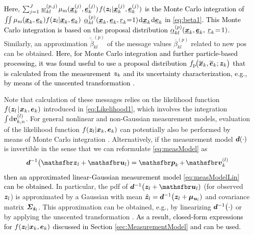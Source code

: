\documentclass[10pt, twoside, romanappendices]{IEEEtran}
\providecommand{\rd}{\textcolor{black}}
\providecommand{\ist}{\hspace*{.3mm}}
\providecommand{\rmv}{\hspace*{-.3mm}}
\begin{document}
\rd{Here, $\sum^{J}_{j=1} \ist \underline{w}^{(p,j)}_{kl} \ist \mu_{\mathrm{m}}(\underline{\V{x}}^{(j)}_k,\underline{\V{e}}^{(j)}_k) \ist f(\V{z}_{l}| \underline{\V{x}}^{(j)}_k, \underline{\V{e}}^{(j)}_{k})$ is the Monte Carlo integration \cite{DouFreGor:01} of 
$ \int \rmv\rmv\rmv\rmv \int \mu_{\mathrm{m}}(\underline{\V{x}}_k,\underline{\V{e}}_k)  f(\V{z}_{l}| \underline{\V{x}}_k, \underline{\V{e}}_{k})$ $\underline{\alpha}_{kl}^{(p)}(\underline{\V{x}}_{k}, \underline{\V{e}}_{k}, \underline{r}_{k} \rmv\rmv\rmv=\rmv\rmv\rmv1) \ist \mathrm{d} \underline{\V{x}}_{k} \ist \mathrm{d} \underline{\V{e}}_{k}$ in \eqref{eq:beta1}. This Monte Carlo integration is based on the proposal distribution  $\underline{\alpha}_{kl}^{(p)}(\underline{\bm{x}}_{k}, \underline{\bm{e}}_{k},$ $\underline{r}_{k}\rmv\rmv=\rmv\rmv1)$.} Similarly, an approximation $\tilde{\overline{\beta}}_{kl}^{(p)}$ of the message values $\overline{\beta}_{kl}^{(p)}$  related to new \acp{po} can be obtained. \rd{Here, for Monte Carlo integration and further particle-based processing, it was found useful to use a proposal distribution $f_{\mathrm{p}} \rmv\big(\overline{\boldsymbol{x}}_k,\overline{\boldsymbol{e}}_k;\V{z}_k\big)$ that is calculated from the measurement $\bm{z}_k$ and its uncertainty characterization, e.g., by means of the unscented transformation \cite{JulUhl:04}.}
 
Note that calculation of these messages relies on the likelihood function $ f(\V{z}_{l} \ist | \ist \V{x}_k, \V{e}_{k})$ introduced in \eqref{eq:Likelihood1}, which involves the integration $\int \rmv \mathrm{d} \V{v}^{(l)}_{k,n}$. For general nonlinear and non-Gaussian measurement models, evaluation of the likelihood function $f(\bm{z}_l|\bm{x}_k,\bm{e}_k)$ can potentially also be performed by means of Monte Carlo integration \cite{DouFreGor:01}. Alternatively, if the measurement model $\bm{d}(\cdot)$ is invertible in the sense that we can reformulate \eqref{eq:measModel} as
\begin{equation}
\V{d}^{-1}\big(\RV{z}_l + \RV{u}_l)  = \RV{p}_{k} \rmv+\rmv \RV{v}^{(l)}_{k} \label{eq:measModel2}
\vspace{.4mm}
\end{equation}
\rd{then an approximated linear-Gaussian measurement model \eqref{eq:measModelLin} can be obtained.} In particular, the \ac{pdf} of $\V{d}^{-1}\big(\V{z}_l + \RV{u}_l)$ (for observed $\bm{z}_l$) is approximated by a Gaussian with mean $\tilde{\bm{z}}_l = \bm{d}^{-1}\big(\bm{z}_l + \bm{\mu}_{\bm{u}_l})$ and covariance matrix $\M{\Sigma}_{\tilde{\V{z}}_l}$. This approximation can be obtained, e.g., by linearizing $\bm{d}^{-1}\big(\cdot)$ or by applying the unscented transformation \cite{JulUhl:04}. \rd{As a result, closed-form expressions for $f(\bm{z}_l|\bm{x}_k,\bm{e}_k)$ discussed in Section \ref{sec:MeasurementModel} and \cite[Section.~2]{MeyWil:SM21} can be used.}
 
\end{document}
